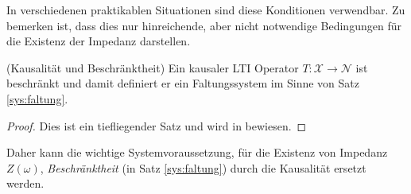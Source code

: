 \begin{bem}
In verschiedenen praktikablen Situationen sind diese Konditionen verwendbar. Zu bemerken ist, dass dies nur hinreichende, aber nicht notwendige Bedingungen für die Existenz der Impedanz darstellen. 
\end{bem}
                                                                                                                                                                                                                                                                                                    \begin{satz}\label{eis:be}                                                                                                                                                                                                                                                                                       (Kausalität und Beschränktheit) 
                                                                                                                                                                                                                                                                                                   Ein kausaler LTI Operator $T: \mathscr{X} \rightarrow \mathscr{N}$ ist beschränkt und damit definiert er ein Faltungssystem im Sinne von Satz \ref{sys:faltung}.
                                                                                                                                                                                                                                                                                                   \begin{proof}
                                                                                                                                                                                                                                                                                                   Dies ist ein tiefliegender Satz und wird in \cite{Dambrowski2013} bewiesen.
                                                                                                                                                                                                                                                                                                  \end{proof}
                                                                                                                                                                                                                                                                                                  Daher kann die wichtige Systemvoraussetzung, für die Existenz von Impedanz $Z(\omega)$, \textit{Beschränktheit} (in Satz \ref{sys:faltung}) durch die Kausalität ersetzt werden. 
                                                                                                                                                                                                                                                                                                      \end{satz}
